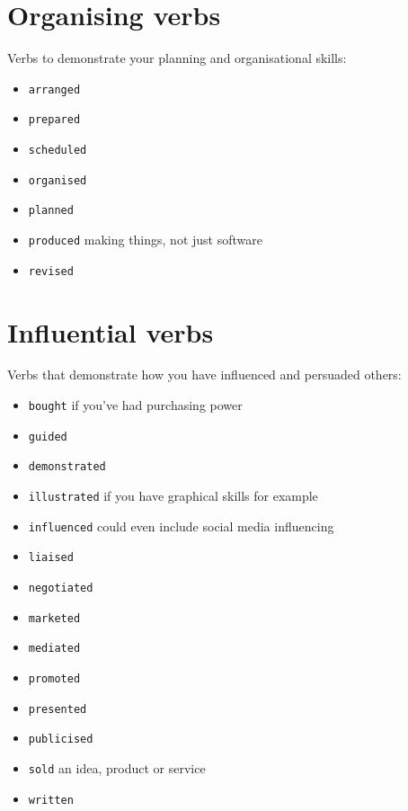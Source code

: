 \documentclass[
]{book}
\providecommand{\tightlist}{%
  \setlength{\itemsep}{0pt}\setlength{\parskip}{0pt}}
\begin{document}
\hypertarget{planning}{%
\section{Organising verbs}\label{planning}}

Verbs to demonstrate your planning and organisational skills:

\begin{itemize}
\tightlist
\item
  \texttt{arranged}
\item
  \texttt{prepared}
\item
  \texttt{scheduled}
\item
  \texttt{organised}
\item
  \texttt{planned}
\item
  \texttt{produced} making things, not just software
\item
  \texttt{revised}
\end{itemize}

\hypertarget{influencing}{%
\section{Influential verbs}\label{influencing}}

Verbs that demonstrate how you have influenced and persuaded others:

\begin{itemize}
\tightlist
\item
  \texttt{bought} if you've had purchasing power
\item
  \texttt{guided}
\item
  \texttt{demonstrated}
\item
  \texttt{illustrated} if you have graphical skills for example
\item
  \texttt{influenced} could even include social media influencing
\item
  \texttt{liaised}
\item
  \texttt{negotiated}
\item
  \texttt{marketed}
\item
  \texttt{mediated}
\item
  \texttt{promoted}
\item
  \texttt{presented}
\item
  \texttt{publicised}
\item
  \texttt{sold} an idea, product or service
\item
  \texttt{written}
\end{itemize}
\end{document}
